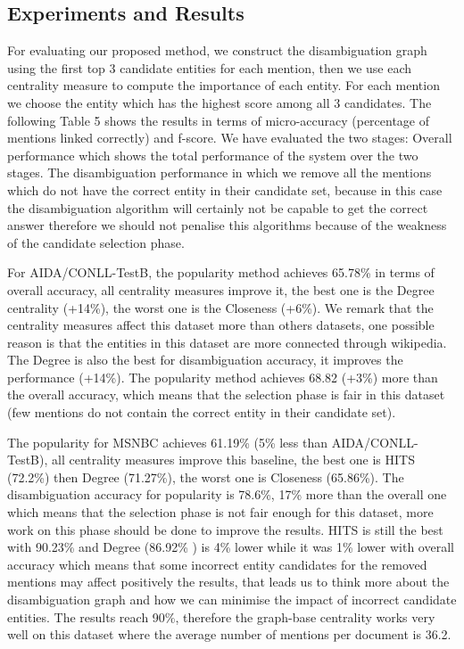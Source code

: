 \documentclass{llncs}
\begin{document}
\subsection{Experiments and Results}
For evaluating our proposed method, we construct the disambiguation graph using the first top 3 candidate entities for each mention, then we use each centrality measure to compute the importance of each entity. For each mention we choose the entity which has the highest score among all 3 candidates. The following Table 5 shows the results in terms of micro-accuracy (percentage of mentions linked correctly) and f-score. 
We have evaluated the two stages: Overall performance which shows the total performance of the system over the two stages. The disambiguation performance in which we remove all the mentions which do not have the correct entity in their candidate set, because in this case the disambiguation algorithm will certainly not be capable to get the correct answer therefore we should not penalise this algorithms because of the weakness of the candidate selection phase. 

For AIDA/CONLL-TestB, the popularity method achieves 65.78\% in terms of overall accuracy, all centrality measures improve it, the best one is the Degree centrality (+14\%), the worst one is the Closeness (+6\%). We remark that the centrality measures affect this dataset more than others datasets, one possible reason is that the entities in this dataset are more connected through wikipedia. The Degree is also the best for disambiguation accuracy, it improves the performance (+14\%). The popularity method achieves 68.82 (+3\%) more than the overall accuracy, which means that the selection phase is fair in this dataset (few mentions do not contain the correct entity in their candidate set).

The popularity for MSNBC achieves 61.19\% (5\% less than AIDA/CONLL-TestB), all centrality measures improve this baseline, the best one is HITS (72.2\%) then Degree (71.27\%), the worst one is Closeness (65.86\%). The disambiguation accuracy for popularity is  78.6\%, 17\% more than the overall one which means that the selection phase is not fair enough for this dataset, more work on this phase should be done to improve the results. HITS is still the best with 90.23\% and Degree (86.92\% ) is 4\% lower  while it was 1\% lower with overall accuracy  which means that some incorrect entity candidates for the  removed mentions may affect positively the results, that leads us to think more about the disambiguation graph and how we can minimise the impact of incorrect candidate entities.  The results reach 90\%, therefore  the graph-base centrality works very well on this dataset  where the average number of mentions per document is 36.2.
 
\end{document}
